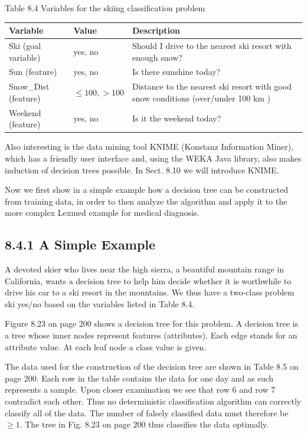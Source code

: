 \documentclass[10pt]{book}
\begin{document}
\begin{center}
\begin{enumerate}
\begin{center}
Table 8.4 Variables for the skiing classification problem

\begin{center}
\begin{tabular}{|l|l|l|}
\hline
Variable & Value & Description \\
\hline
Ski (goal variable) & yes, no & Should I drive to the nearest ski resort with enough snow? \\
\hline
Sun (feature) & yes, no & Is there sunshine today? \\
\hline
Snow\_Dist (feature) & $\leq 100,>100$ & Distance to the nearest ski resort with good snow conditions (over/under 100 km ) \\
\hline
Weekend (feature) & yes, no & Is it the weekend today? \\
\hline
\end{tabular}
\end{center}

Also interesting is the data mining tool KNIME (Konstanz Information Miner), which has a friendly user interface and, using the WEKA Java library, also makes induction of decision trees possible. In Sect. 8.10 we will introduce KNIME.


Now we first show in a simple example how a decision tree can be constructed from training data, in order to then analyze the algorithm and apply it to the more complex Lexmed example for medical diagnosis.

\subsection*{8.4.1 A Simple Example}
A devoted skier who lives near the high sierra, a beautiful mountain range in California, wants a decision tree to help him decide whether it is worthwhile to drive his car to a ski resort in the mountains. We thus have a two-class problem ski yes/no based on the variables listed in Table 8.4.

Figure 8.23 on page 200 shows a decision tree for this problem. A decision tree is a tree whose inner nodes represent features (attributes). Each edge stands for an attribute value. At each leaf node a class value is given.

The data used for the construction of the decision tree are shown in Table 8.5 on page 200. Each row in the table contains the data for one day and as such represents a sample. Upon closer examination we see that row 6 and row 7 contradict each other. Thus no deterministic classification algorithm can correctly classify all of the data. The number of falsely classified data must therefore be $\geq 1$. The tree in Fig. 8.23 on page 200 thus classifies the data optimally.


\end{center}
\end{enumerate}
\end{center}
\end{document}
